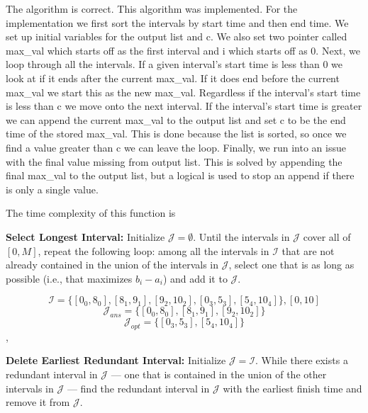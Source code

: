 \documentclass{hw}
\begin{document}
\begin{problem}
\begin{solution}
    The algorithm is correct. This algorithm was implemented. For the implementation we first sort the intervals by start time and then end time. We set up initial variables for the output list and c. We also set two pointer called max_val which starts off as the first interval and i which starts off as 0. Next, we loop through all the intervals. If a given interval's start time is less than 0 we look at if it ends after the current max_val. If it does end before the current max_val we start this as the new max_val. Regardless if the interval's start time is less than c we move onto the next interval. If the interval's start time is greater we can append the current max_val to the output list and set c to be the end time of the stored max_val. This is done because the list is sorted, so once we find a value greater than c we can leave the loop. Finally, we run into an issue with the final value missing from output list. This is solved by appending the final max_val to the output list, but a logical is used to stop an append if there is only a single value.
    
    The time complexity of this function is 
\end{solution}

  \begin{subproblem}
    \textbf{Select Longest Interval:}
  Initialize $\mathcal{J}=\emptyset$.
  Until the intervals in $\mathcal{J}$ cover all of $[0,M]$,
  repeat the following loop: among all the intervals in
  $\mathcal{I}$ that are not already contained in the union
  of the intervals in $\mathcal{J}$, select one that is as
  long as possible (i.e., that maximizes $b_i-a_i$) and
  add it to $\mathcal{J}$.
  \end{subproblem}

\begin{solution}
$$
\mathcal{I} = \{[0_0,8_0], [8_1,9_1], [9_2,10_2], [0_3,5_3], [5_4,10_4]\}, [0,10]
$$
$$
\mathcal{J}_{ans} = \{[0_0,8_0], [8_1,9_1], [9_2,10_2]\}
$$
$$
\mathcal{J}_{opt} = \{[0_3,5_3], [5_4,10_4]\}
$$
,\end{solution}

  \begin{subproblem}
    \textbf{Delete Earliest Redundant Interval:}
  Initialize $\mathcal{J}=\mathcal{I}$. While there
  exists a redundant interval in $\mathcal{J}$ --- one
  that is contained in the union of the other intervals
  in $\mathcal{J}$ --- find the redundant interval in
  $\mathcal{J}$ with the earliest finish time and
  remove it from $\mathcal{J}$.
\end{subproblem}


\end{problem}
\end{document}
